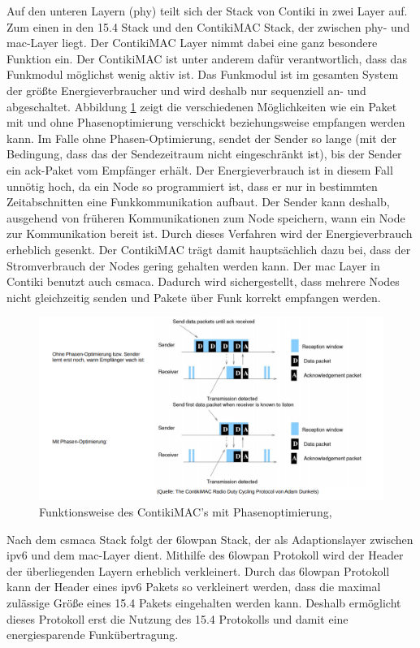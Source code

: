 	Auf den unteren Layern (\ac{phy}) teilt sich der Stack von Contiki in zwei Layer auf. Zum einen in den \ac{15.4} Stack und den ContikiMAC Stack, der zwischen \ac{phy}- und \ac{mac}-Layer liegt. Der ContikiMAC Layer nimmt dabei eine ganz besondere Funktion ein. Der ContikiMAC ist unter anderem dafür verantwortlich, dass das Funkmodul möglichst wenig aktiv ist. Das Funkmodul ist im gesamten System der größte Energieverbraucher und wird deshalb nur sequenziell an- und abgeschaltet. Abbildung \ref{ContikiMAC} zeigt die verschiedenen Möglichkeiten wie ein Paket mit und ohne Phasenoptimierung verschickt beziehungsweise empfangen werden kann. Im Falle ohne Phasen-Optimierung, sendet der Sender so lange (mit der Bedingung, dass das der Sendezeitraum nicht eingeschränkt ist), bis der Sender ein \ac{ack}-Paket vom Empfänger erhält. Der Energieverbrauch ist in diesem Fall unnötig hoch, da ein Node so programmiert ist, dass er nur in bestimmten Zeitabschnitten eine Funkkommunikation aufbaut. Der Sender kann deshalb, ausgehend von früheren Kommunikationen zum Node speichern, wann ein Node zur Kommunikation bereit ist. Durch dieses Verfahren wird der Energieverbrauch erheblich gesenkt. Der ContikiMAC trägt damit hauptsächlich dazu bei, dass der Stromverbrauch der Nodes gering gehalten werden kann. Der \ac{mac} Layer in Contiki benutzt auch \ac{csmaca}. Dadurch wird sichergestellt, dass mehrere Nodes nicht gleichzeitig senden und Pakete über Funk korrekt empfangen werden. \\
	\begin{figure}
		\centering
		\includegraphics[scale=0.5]{Grafiken-Julian/ContikiMAC.png}
		\caption{Funktionsweise des ContikiMAC's mit Phasenoptimierung, \cite{dunkelsmac}}
		\label{ContikiMAC}
	\end{figure}
	Nach dem \ac{csmaca} Stack folgt der \ac{6lowpan} Stack, der als Adaptionslayer zwischen \ac{ipv6} und dem \ac{mac}-Layer dient. Mithilfe des \ac{6lowpan} Protokoll wird der Header der überliegenden Layern erheblich verkleinert. Durch das \ac{6lowpan} Protokoll kann der Header eines \ac{ipv6} Pakets so verkleinert werden, dass die maximal zulässige Größe eines \ac{15.4} Pakets eingehalten werden kann. Deshalb ermöglicht dieses Protokoll erst die Nutzung des \ac{15.4} Protokolls und damit eine energiesparende Funkübertragung.\\
